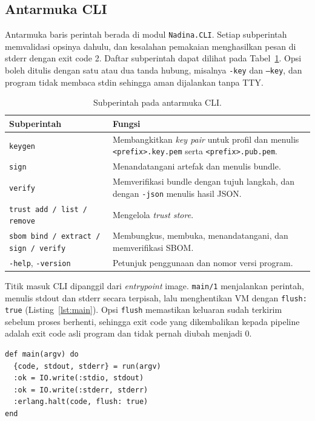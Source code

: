\subsection{Antarmuka CLI}
Antarmuka baris perintah berada di modul \texttt{Nadina.CLI}. Setiap subperintah memvalidasi
opsinya dahulu, dan kesalahan pemakaian menghasilkan pesan di stderr dengan exit code 2. Daftar
subperintah dapat dilihat pada Tabel~\ref{tab:cli}. Opsi boleh ditulis dengan satu atau dua tanda
hubung, misalnya \texttt{-key} dan \texttt{--key}, dan program tidak membaca stdin sehingga aman
dijalankan tanpa TTY.

\begin{table}[H]
\centering
\begin{tabular}{@{}p{3.6cm}p{11cm}@{}}
\toprule
Subperintah & Fungsi \\
\midrule
\texttt{keygen} & Membangkitkan \textit{key pair} untuk profil dan menulis \texttt{<prefix>.key.pem} serta \texttt{<prefix>.pub.pem}. \\
\texttt{sign} & Menandatangani artefak dan menulis bundle. \\
\texttt{verify} & Memverifikasi bundle dengan tujuh langkah, dan dengan \texttt{-json} menulis hasil JSON. \\
\texttt{trust add / list / remove} & Mengelola \textit{trust store}. \\
\texttt{sbom bind / extract / sign / verify} & Membungkus, membuka, menandatangani, dan memverifikasi SBOM. \\
\texttt{-help}, \texttt{-version} & Petunjuk penggunaan dan nomor versi program. \\
\bottomrule
\end{tabular}
\caption{Subperintah pada antarmuka CLI.}
\label{tab:cli}
\end{table}

Titik masuk CLI dipanggil dari \textit{entrypoint} image. \texttt{main/1} menjalankan perintah,
menulis stdout dan stderr secara terpisah, lalu menghentikan VM dengan \texttt{flush: true}
(Listing~\ref{lst:main}). Opsi \texttt{flush} memastikan keluaran sudah terkirim sebelum
proses berhenti, sehingga exit code yang dikembalikan kepada pipeline adalah exit code asli
program dan tidak pernah diubah menjadi 0.

\begin{lstlisting}[basicstyle=\ttfamily\footnotesize,caption={Titik masuk CLI},label={lst:main},numbers=none]
def main(argv) do
  {code, stdout, stderr} = run(argv)
  :ok = IO.write(:stdio, stdout)
  :ok = IO.write(:stderr, stderr)
  :erlang.halt(code, flush: true)
end
\end{lstlisting}

